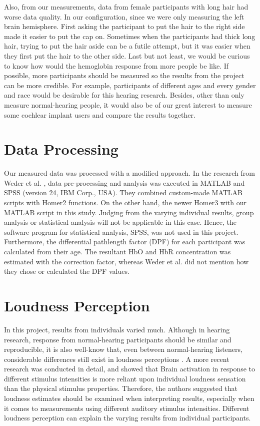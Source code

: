 Also, from our measurements, data from female participants with long hair had worse data quality. In our configuration, since we were only measuring the left brain hemisphere. First asking the participant to put the hair to the right side made it easier to put the cap on. Sometimes when the participants had thick long hair, trying to put the hair aside can be a futile attempt, but it was easier when they first put the hair to the other side. Last but not least, we would be curious to know how would the hemoglobin response from more people be like. If possible, more participants should be measured so the results from the project can be more credible. For example, participants of different ages and every gender and race would be desirable for this hearing research. Besides, other than only measure normal-hearing people, it would also be of our great interest to measure some cochlear implant users and compare the results together.

\section {Data Processing}
Our measured data was processed with a modified approach. In the research from Weder et al. \citeyear{Weder2018}, data pre-processing and analysis was executed in MATLAB and SPSS (version 24, IBM Corp., USA). They combined custom-made MATLAB scripts with Homer2 functions. On the other hand, the newer Homer3 with our MATLAB script in this study. Judging from the varying individual results, group analysis or statistical analysis will not be applicable in this case. Hence, the software program for statistical analysis, SPSS, was not used in this project. Furthermore, the differential pathlength factor (DPF) for each participant was calculated from their age. The resultant HbO and HbR concentration was estimated with the correction factor, whereas Weder et al. \citeyear{Weder2018} did not mention how they chose or calculated the DPF values.

\section{Loudness Perception}
In this project, results from individuals varied much. Although in hearing research, response from normal-hearing participants should be similar and reproducible, it is also well-know that, even between normal-hearing listeners,
considerable differences still exist in loudness perceptions \cite {Brand2001}. A more recent research \cite {Weder2020} was conducted in detail, and showed that Brain activation in response to different stimulus intensities is more reliant upon individual loudness sensation than the physical stimulus properties. Therefore, the authors suggested that loudness
estimates should be examined when interpreting results, especially when it comes to measurements using different auditory stimulus intensities. Different loudness perception can explain the varying results from individual participants.

